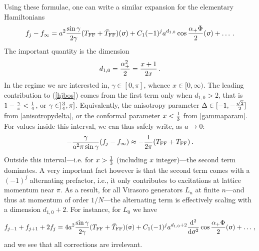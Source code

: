 \documentclass[a4paper,10pt]{article}
\newcommand{\eXXZ}{f}
\begin{document}
Using these formulae, one can write a similar expansion for the elementary Hamiltonians  \cite{Lukyanov}
%
\begin{equation}
\eXXZ_j-\eXXZ_\infty=a^2 {\sin\gamma\over 2\gamma}(T_{\rm FF}+\bar{T}_{\rm FF})(\upsigma)+C_1 (-1)^j a^{d_{1,0}} \cos {\alpha_+\Phi\over 2}(\upsigma)+\ldots \,. \label{hjbos}
\end{equation}
%
The important quantity is the dimension
%
\begin{equation}
d_{1,0}={\alpha_+^2\over 2}={x+1\over 2x} \,.
\end{equation}
%
In the regime we are interested in, $\gamma\in [0,\pi]$, whence $x\in[0,\infty)$. The leading contribution to (\ref{hjbos}) comes from the first term only when $d_{1,0}>2$, that is $1-{\gamma\over \pi}<{1\over 4}$, or $\gamma\in ]{3\over 4},\pi]$. Equivalently, the anisotropy parameter $\Delta\in [-1,-{\sqrt{2}\over 2}]$ from \eqref{anisotropydelta}, or the conformal parameter $x<{1\over 3}$ from \eqref{gammaparam}. For values inside this interval, we can thus safely write, as $a\to 0$:
%
\begin{equation}
-{\gamma\over a^2\pi\sin\gamma}(\eXXZ_j-\eXXZ_\infty)\approx -{1\over 2\pi}(T_{\rm FF}+\bar{T}_{\rm FF}) \,.
\end{equation}
%
Outside this interval---i.e. for $x>{1\over 3}$ (including $x$ integer)---the second term dominates. A very important fact however is that the second term comes with a $(-1)^j$ alternating prefactor, i.e., it only contributes to excitations at lattice momentum near $\pi$. As a result, for all Virasoro generators $L_n$ at finite $n$---and thus at momentum of order $1/N$---the alternating term is effectively scaling with a dimension $d_{1,0}+2$.
For instance, for $L_0$ we have
%
\begin{equation}
\eXXZ_{j-1}+\eXXZ_{j+1}+2\eXXZ_j=4a^2 {\sin\gamma\over 2\gamma}(T_{\rm FF}+\bar{T}_{\rm FF})(\upsigma)+C_1 (-1)^j a^{d_{1,0}+2} {{\rm d}^2\over {\rm d}\upsigma^2}\cos {\alpha_+\Phi\over 2}(\upsigma)+\ldots \,,
\end{equation}
%
and we see that all corrections are irrelevant. 
\end{document}
